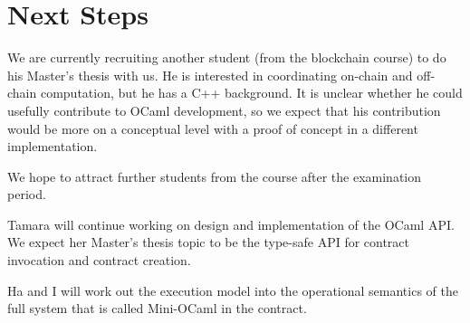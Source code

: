 \documentclass[a4paper,11pt]{article}
\begin{document}
\section{Next Steps}
\label{sec:next-steps}

We are currently recruiting another student (from the blockchain course) to do his Master's thesis with us. He is interested in coordinating on-chain and off-chain computation, but he has a C++ background. It is unclear whether he could usefully contribute to OCaml development, so we expect that his contribution would be more on a conceptual level with a proof of concept in a different implementation.

We hope to attract further students from the course after the examination period.

Tamara will continue working on design and implementation of the OCaml API. We expect her Master's thesis topic to be the type-safe API for contract invocation and contract creation.

Ha and I will work out the execution model into the operational semantics of the full system that is called Mini-OCaml in the  contract. 



\end{document}
